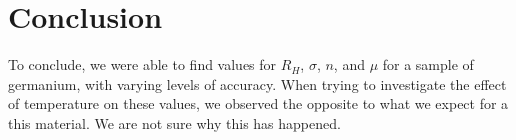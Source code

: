 \documentclass[12pt]{article}
\numberwithin{equation}{section}
\numberwithin{figure}{section}
\numberwithin{table}{section}
\begin{document}
    \section{Conclusion}\label{sec:Conclusion}
    To conclude, we were able to find values for $R_H$, $\sigma$, $n$, and $\mu$ for a sample of 
    germanium, with varying levels of accuracy. When trying to investigate the effect of temperature 
    on these values, we observed the opposite to what we expect for a this material. We are not 
    sure why this has happened. 
\end{document}

